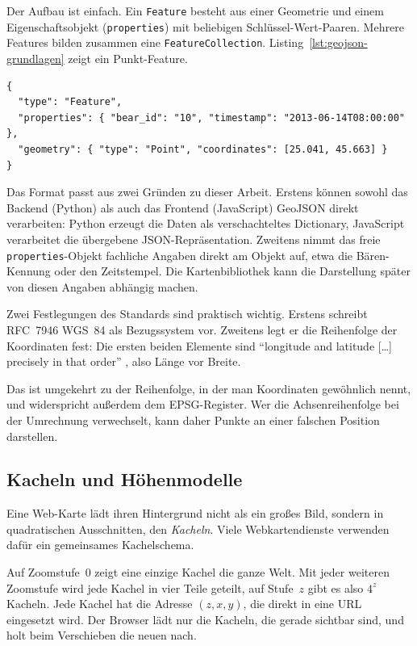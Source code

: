 \documentclass[12pt,a4paper]{report}
\begin{document}
Der Aufbau ist einfach. Ein \texttt{Feature} besteht aus einer Geometrie und einem
Eigenschaftsobjekt (\texttt{properties}) mit beliebigen Schlüssel-Wert-Paaren. Mehrere
Features bilden zusammen eine \texttt{Feature\-Collection}.
Listing~\ref{lst:geojson-grundlagen} zeigt ein Punkt-Feature.

\begin{lstlisting}[caption={Aufbau eines GeoJSON-Punkt-Features},
                   label={lst:geojson-grundlagen}]
{
  "type": "Feature",
  "properties": { "bear_id": "10", "timestamp": "2013-06-14T08:00:00" },
  "geometry": { "type": "Point", "coordinates": [25.041, 45.663] }
}
\end{lstlisting}

Das Format passt aus zwei Gründen zu dieser Arbeit.
Erstens können sowohl das Backend (Python) als auch
das Frontend (JavaScript) GeoJSON direkt verarbeiten:
Python erzeugt die Daten als verschachteltes Dictionary,
JavaScript verarbeitet die übergebene JSON-Repräsentation.
 Zweitens nimmt das freie \texttt{properties}-Objekt fachliche Angaben direkt am
Objekt auf, etwa die Bären-Kennung oder den Zeitstempel. Die Kartenbibliothek kann die
Darstellung später von diesen Angaben abhängig machen.

Zwei Festlegungen des Standards sind praktisch wichtig. Erstens schreibt RFC~7946 WGS~84
als Bezugssystem vor. Zweitens legt er die Reihenfolge der Koordinaten fest: Die ersten
beiden Elemente sind \enquote{longitude and latitude [\ldots] precisely in that order}
\cite{RFC7946}, also Länge vor Breite.

Das ist umgekehrt zu der Reihenfolge, in der man Koordinaten gewöhnlich nennt, und
widerspricht außerdem dem EPSG-Register. Wer die Achsenreihenfolge bei der Umrechnung verwechselt, kann daher Punkte
an einer falschen Position darstellen.

\subsection{Kacheln und Höhenmodelle}
\label{subsec:kacheln}

Eine Web-Karte lädt ihren Hintergrund nicht als ein großes Bild, sondern in quadratischen
Ausschnitten, den \emph{Kacheln}. Viele Webkartendienste verwenden dafür ein gemeinsames Kachelschema.

Auf Zoomstufe~0 zeigt eine einzige Kachel die ganze Welt. Mit jeder weiteren Zoomstufe
wird jede Kachel in vier Teile geteilt, auf Stufe~$z$ gibt es also $4^{z}$ Kacheln. Jede
Kachel hat die Adresse $(z, x, y)$, die direkt in eine URL eingesetzt wird. Der Browser
lädt nur die Kacheln, die gerade sichtbar sind, und holt beim Verschieben die neuen nach.
\end{document}
